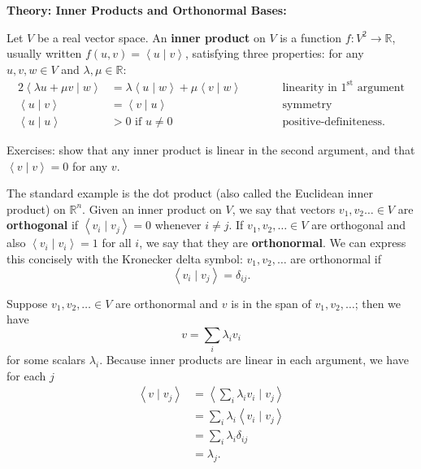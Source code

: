 \documentclass{article}
\newcommand{\braket}[2]{\left\langle #1 \mid #2 \right\rangle}
\begin{document}
\clearpage















\textbf{Theory: Inner Products and Orthonormal Bases:}

\bigskip



Let $V$ be a real vector space. An \textbf{inner product} on $V$ is a function $f\colon V^2\to \mathbb{R}$, usually written $f(u,v)=\braket{u}{v}$, satisfying three properties: for any $u,v,w\in V$ and $\lambda,\mu\in\mathbb{R}$:
\begin{alignat*}{2}
	\braket{\lambda u + \mu v}{w} &= \lambda\braket{u}{w} + \mu\braket{v}{w}\qquad&& \mbox{linearity in $1^\mathrm{st}$ argument}\\
	\braket{u}{v} &= \braket{v}{u}\qquad&& \mbox{symmetry}\\
	\braket{u}{u} &> 0\mbox{ if $u\neq 0$}\qquad&& \mbox{positive-definiteness.}
\end{alignat*}

Exercises: show that any inner product is linear in the second argument, and that $\braket{v}{v}=0$ for any $v$.

The standard example is the dot product (also called the Euclidean inner product) on $\mathbb{R}^n$. Given an inner product on $V$, we say that vectors $v_1,v_2\hdots\in V$ are \textbf{orthogonal} if $\braket{v_i}{v_j}=0$ whenever $i\neq j$. If $v_1,v_2,\hdots\in V$ are orthogonal and also $\braket{v_i}{v_i}=1$ for all $i$, we say that they are \textbf{orthonormal}. We can express this concisely with the Kronecker delta symbol: $v_1,v_2,\hdots$ are orthonormal if
\[\braket{v_i}{v_j}=\delta_{ij}.\]\medskip

Suppose $v_1,v_2,\hdots\in V$ are orthonormal and $v$ is in the span of $v_1,v_2,\hdots$; then we have
\[v=\sum_{i} \lambda_i v_i\]
for some scalars $\lambda_i$. Because inner products are linear in each argument, we have for each $j$
\begin{align*}
	\braket{v}{v_j} &=\braket{\sum_i \lambda_i v_i}{v_j}\\
	&=\sum_i \lambda_i \braket{v_i}{v_j}\\
	&=\sum_i\lambda_i \delta_{ij}\\
	&= \lambda_j.
\end{align*}
\end{document}
